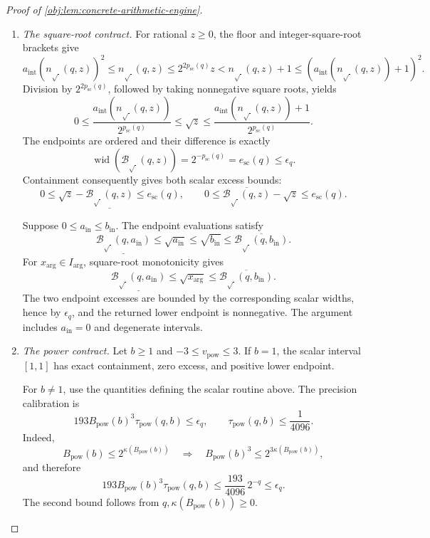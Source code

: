 \documentclass[11pt]{article}
\begin{document}
\begin{proof}[Proof of \cref{obj:lem:concrete-arithmetic-engine}]
\begin{enumerate}
\item \emph{The square-root contract.}
For rational \(z\ge0\), the floor and integer-square-root brackets give
\[
a_{\mathrm{int}}(n_{\sqrt{\ }}(q,z))^2
 \le n_{\sqrt{\ }}(q,z)
 \le2^{2p_{\mathrm{sc}}(q)}z
 <n_{\sqrt{\ }}(q,z)+1
 \le(a_{\mathrm{int}}(n_{\sqrt{\ }}(q,z))+1)^2.
\]
Division by \(2^{2p_{\mathrm{sc}}(q)}\), followed by taking nonnegative square roots, yields
\[
0\le
\frac{a_{\mathrm{int}}(n_{\sqrt{\ }}(q,z))}
     {2^{p_{\mathrm{sc}}(q)}}
 \le\sqrt z\le
\frac{a_{\mathrm{int}}(n_{\sqrt{\ }}(q,z))+1}
     {2^{p_{\mathrm{sc}}(q)}}.
\]
The endpoints are ordered and their difference is exactly
\[
\operatorname{wid}(\mathcal B_{\sqrt{\ }}(q,z))
 =2^{-p_{\mathrm{sc}}(q)}
 =e_{\mathrm{sc}}(q)\le\epsilon_q.
\]
Containment consequently gives both scalar excess bounds:
\[
0\le\sqrt z-\underline{\mathcal B_{\sqrt{\ }}(q,z)}
 \le e_{\mathrm{sc}}(q),
\qquad
0\le\overline{\mathcal B_{\sqrt{\ }}(q,z)}-\sqrt z
 \le e_{\mathrm{sc}}(q).
\]

Suppose \(0\le a_{\mathrm{in}}\le b_{\mathrm{in}}\). The endpoint evaluations satisfy
\[
\underline{\mathcal B_{\sqrt{\ }}(q,a_{\mathrm{in}})}
 \le\sqrt{a_{\mathrm{in}}}
 \le\sqrt{b_{\mathrm{in}}}
 \le\overline{\mathcal B_{\sqrt{\ }}(q,b_{\mathrm{in}})}.
\]
For \(x_{\mathrm{arg}}\in I_{\mathrm{arg}}\), square-root monotonicity gives
\[
\underline{\mathcal B_{\sqrt{\ }}(q,a_{\mathrm{in}})}
 \le\sqrt{x_{\mathrm{arg}}}
 \le\overline{\mathcal B_{\sqrt{\ }}(q,b_{\mathrm{in}})}.
\]
The two endpoint excesses are bounded by the corresponding scalar widths, hence by \(\epsilon_q\), and the returned lower endpoint is nonnegative. The argument includes \(a_{\mathrm{in}}=0\) and degenerate intervals.

\item \emph{The power contract.}
Let \(b\ge1\) and \(-3\le v_{\mathrm{pow}}\le3\). If \(b=1\), the scalar interval
\([1,1]\) has exact containment, zero excess, and positive lower endpoint.

For \(b\ne1\), use the quantities defining the scalar routine above. The precision calibration is
\[
193B_{\mathrm{pow}}(b)^3\tau_{\mathrm{pow}}(q,b)
 \le\epsilon_q,
\qquad
\tau_{\mathrm{pow}}(q,b)\le\frac1{4096}.
\]
Indeed,
\[
B_{\mathrm{pow}}(b)\le2^{\kappa(B_{\mathrm{pow}}(b))}
\quad\Longrightarrow\quad
B_{\mathrm{pow}}(b)^3
 \le2^{3\kappa(B_{\mathrm{pow}}(b))},
\]
and therefore
\[
193B_{\mathrm{pow}}(b)^3\tau_{\mathrm{pow}}(q,b)
 \le\frac{193}{4096}\,2^{-q}\le\epsilon_q.
\]
The second bound follows from \(q,\kappa(B_{\mathrm{pow}}(b))\ge0\).


\end{enumerate}
\end{proof}
\end{document}
